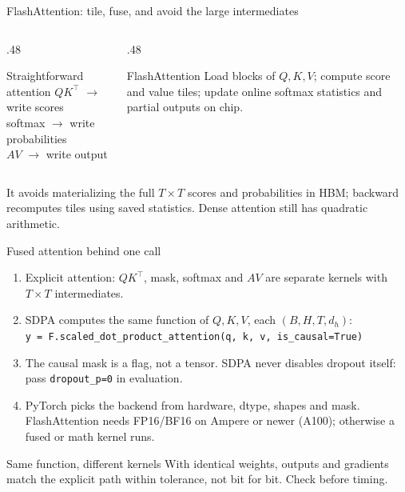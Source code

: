 \documentclass[handout]{beamer}
\begin{document}
\begin{frame}{FlashAttention: tile, fuse, and avoid the large intermediates}
  \begin{columns}[t]
    \begin{column}{.48\linewidth}
      \begin{alertblock}{Straightforward attention}
        $QK^\top$ $\to$ write scores\\[3pt]
        softmax $\to$ write probabilities\\[3pt]
        $AV$ $\to$ write output
      \end{alertblock}
    \end{column}
    \begin{column}{.48\linewidth}
      \begin{block}{FlashAttention}
        Load blocks of $Q,K,V$; compute score and value tiles; update online softmax statistics and partial outputs on chip.
      \end{block}
    \end{column}
  \end{columns}
  \vfill
  \small It avoids materializing the full $T\times T$ scores and probabilities in HBM; backward recomputes tiles using saved statistics. Dense attention still has quadratic arithmetic.
\end{frame}

\begin{frame}{Fused attention behind one call}
  \small
  \begin{enumerate}
      \setlength{\itemsep}{3pt}
    \item Explicit attention: $QK^\top$, mask, softmax and $AV$ are separate kernels with $T\times T$ intermediates.
    \item SDPA computes the same function of $Q,K,V$, each $(B,H,T,d_h)$:\\[1pt]
      {\footnotesize\texttt{y = F.scaled\_dot\_product\_attention(q, k, v, is\_causal=True)}}
    \item The causal mask is a flag, not a tensor. SDPA never disables dropout itself: pass \texttt{dropout\_p=0} in evaluation.
    \item PyTorch picks the backend from hardware, dtype, shapes and mask. FlashAttention needs FP16/BF16 on Ampere or newer (A100); otherwise a fused or math kernel runs.
  \end{enumerate}
  \begin{alertblock}{Same function, different kernels}
    With identical weights, outputs and gradients match the explicit path within tolerance, not bit for bit. Check before timing.
  \end{alertblock}
\end{frame}
\end{document}

